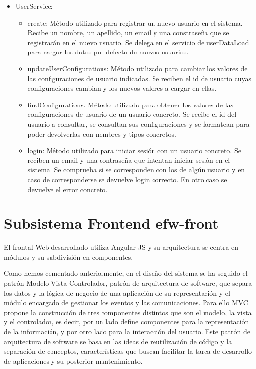\documentclass[12pt, a4paper, twoside]{book}
\begin{document}
\begin{itemize}
\begin{itemize}
		\end{itemize}
		\item UserService: 
		\begin{itemize}
			\item create: Método utilizado para registrar un nuevo usuario en el sistema. Recibe un nombre, un apellido, un email y una constraseña que se registrarán en el nuevo usuario. Se delega en el servicio de userDataLoad para cargar los datos por defecto de nuevos usuarios.
			\item updateUserConfigurations: Método utilizado para cambiar los valores de las configuraciones de usuario indicadas. Se reciben el id de usuario cuyas configuraciones cambian y los nuevos valores a cargar en ellas.
			\item findConfigurations: Método utilizado para obtener los valores de las configuraciones de usuario de un usuario concreto. Se recibe el id del usuario a consultar, se consultan sus configuraciones y se formatean para poder devolverlas con nombres y tipos concretos.
			\item login: Método utilizado para iniciar sesión con un usuario concreto. Se reciben un email y una contraseña que intentan iniciar sesión en el sistema. Se comprueba si se corresponden con los de algún usuario y en caso de corresponderse se devuelve login correcto. En otro caso se devuelve el error concreto.
		\end{itemize}
	\end{itemize}
	
	\section{Subsistema Frontend efw-front}
	
	El frontal Web desarrollado utiliza Angular JS y su arquitectura se centra en módulos y su subdivisión en componentes.
	
	Como hemos comentado anteriormente, en el diseño del sistema se ha seguido el patrón Modelo Vista Controlador, patrón de arquitectura de software, que separa los datos y la lógica de negocio de una aplicación de su representación y el módulo encargado de gestionar los eventos y las comunicaciones. Para ello MVC propone la construcción de tres componentes distintos que son el modelo, la vista y el controlador, es decir, por un lado define componentes para la representación de la información, y por otro lado para la interacción del usuario. Este patrón de arquitectura de software se basa en las ideas de reutilización de código y la separación de conceptos, características que buscan facilitar la tarea de desarrollo de aplicaciones y su posterior mantenimiento. \cite{Patrones}
	
\end{document}
